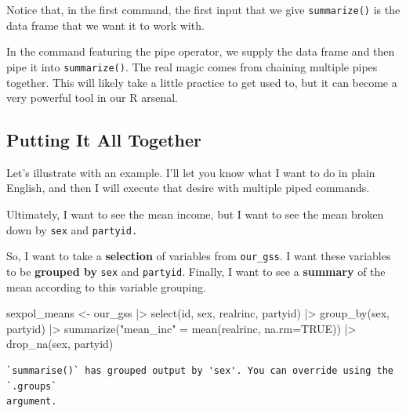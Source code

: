 \documentclass[
  letterpaper,
  DIV=11,
  numbers=noendperiod]{scrreprt}
\newenvironment{Shaded}{\begin{snugshade}}{\end{snugshade}}
\newcommand{\AttributeTok}[1]{\textcolor[rgb]{0.40,0.45,0.13}{#1}}
\newcommand{\ConstantTok}[1]{\textcolor[rgb]{0.56,0.35,0.01}{#1}}
\newcommand{\FunctionTok}[1]{\textcolor[rgb]{0.28,0.35,0.67}{#1}}
\newcommand{\NormalTok}[1]{\textcolor[rgb]{0.00,0.23,0.31}{#1}}
\newcommand{\OtherTok}[1]{\textcolor[rgb]{0.00,0.23,0.31}{#1}}
\newcommand{\SpecialCharTok}[1]{\textcolor[rgb]{0.37,0.37,0.37}{#1}}
\newcommand{\StringTok}[1]{\textcolor[rgb]{0.13,0.47,0.30}{#1}}
\begin{document}
Notice that, in the first command, the first input that we give
\texttt{summarize()} is the data frame that we want it to work with.

In the command featuring the pipe operator, we supply the data frame and
then pipe it into \texttt{summarize()}. The real magic comes from
chaining multiple pipes together. This will likely take a little
practice to get used to, but it can become a very powerful tool in our R
arsenal.

\subsection{Putting It All Together}\label{putting-it-all-together}

Let's illustrate with an example. I'll let you know what I want to do in
plain English, and then I will execute that desire with multiple piped
commands.

Ultimately, I want to see the mean income, but I want to see the mean
broken down by \texttt{sex} and \texttt{partyid.}

So, I want to take a \textbf{selection} of variables from
\texttt{our\_gss}. I want these variables to be \textbf{grouped by}
\texttt{sex} and \texttt{partyid}. Finally, I want to see a
\textbf{summary} of the mean according to this variable grouping.

\begin{Shaded}
\begin{Highlighting}[]
\NormalTok{sexpol\_means }\OtherTok{\textless{}{-}}\NormalTok{ our\_gss }\SpecialCharTok{|\textgreater{}}
  \FunctionTok{select}\NormalTok{(id, sex, realrinc, partyid) }\SpecialCharTok{|\textgreater{}}
  \FunctionTok{group\_by}\NormalTok{(sex, partyid) }\SpecialCharTok{|\textgreater{}}
  \FunctionTok{summarize}\NormalTok{(}\StringTok{"mean\_inc"} \OtherTok{=} \FunctionTok{mean}\NormalTok{(realrinc, }\AttributeTok{na.rm=}\ConstantTok{TRUE}\NormalTok{)) }\SpecialCharTok{|\textgreater{}}
  \FunctionTok{drop\_na}\NormalTok{(sex, partyid)}
\end{Highlighting}
\end{Shaded}

\begin{verbatim}
`summarise()` has grouped output by 'sex'. You can override using the `.groups`
argument.
\end{verbatim}
\end{document}
